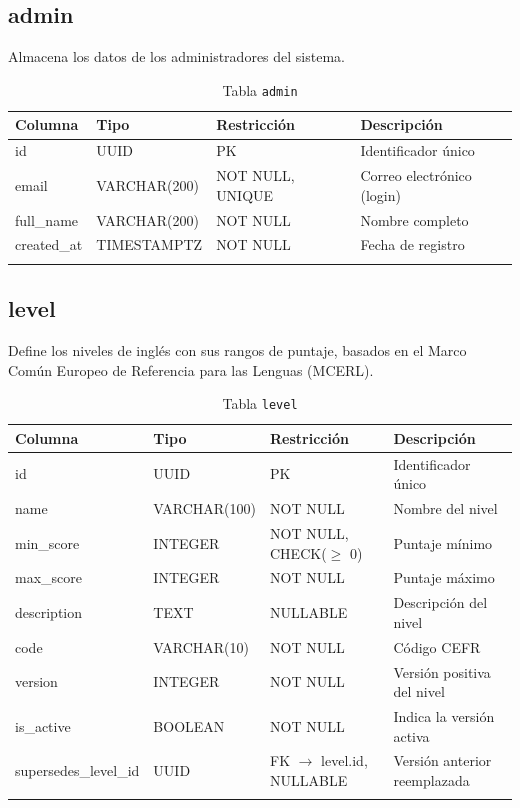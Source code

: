 \subsection{admin}

Almacena los datos de los administradores del sistema.

\begin{longtable}{l l l p{5cm}}
\toprule
\textbf{Columna} & \textbf{Tipo} & \textbf{Restricción} & \textbf{Descripción} \\
\midrule
\endhead
id & UUID & PK & Identificador único \\
email & VARCHAR(200) & NOT NULL, UNIQUE & Correo electrónico (login) \\
full\_name & VARCHAR(200) & NOT NULL & Nombre completo \\
created\_at & TIMESTAMPTZ & NOT NULL & Fecha de registro \\
\bottomrule
\caption{Tabla \texttt{admin}}
\end{longtable}

\subsection{level}

Define los niveles de inglés con sus rangos de puntaje, basados en el Marco Común Europeo de Referencia para las Lenguas (MCERL).

\begin{longtable}{l l l p{5cm}}
\toprule
\textbf{Columna} & \textbf{Tipo} & \textbf{Restricción} & \textbf{Descripción} \\
\midrule
\endhead
id & UUID & PK & Identificador único \\
name & VARCHAR(100) & NOT NULL & Nombre del nivel \\
min\_score & INTEGER & NOT NULL, CHECK($\ge$ 0) & Puntaje mínimo \\
max\_score & INTEGER & NOT NULL & Puntaje máximo \\
description & TEXT & NULLABLE & Descripción del nivel \\
code & VARCHAR(10) & NOT NULL & Código CEFR \\
version & INTEGER & NOT NULL & Versión positiva del nivel \\
is\_active & BOOLEAN & NOT NULL & Indica la versión activa \\
supersedes\_level\_id & UUID & FK $\rightarrow$ level.id, NULLABLE & Versión anterior reemplazada \\
\bottomrule
\caption{Tabla \texttt{level}}
\end{longtable}

